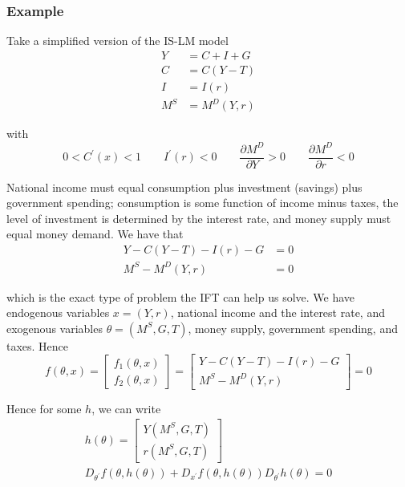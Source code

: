 \documentclass{article}
\begin{document}
\subsubsection{Example}
\label{ssub:example}

Take a simplified version of the IS-LM model
\begin{align*}
  Y   & = C + I + G   \\
  C   & = C(Y - T)    \\
  I   & = I(r)        \\
  M^S & = M^D(Y, r)
\end{align*}

with
\[
  0 < C^\prime(x) < 1
  \quad\quad
  I^\prime(r) < 0
  \quad\quad
  \dfrac{\partial M^D}{\partial Y} > 0
  \quad\quad
  \dfrac{\partial M^D}{\partial r} < 0
\]

National income must equal consumption plus investment (savings) plus government spending; consumption is some function of income minus taxes, the level of investment is determined by the interest rate, and money supply must equal money demand.  We have that
\begin{align*}
  Y - C(Y - T) - I(r) - G & = 0 \\
  M^S - M^D (Y, r)        & = 0
\end{align*}

which is the exact type of problem the IFT can help us solve. We have endogenous variables $x = (Y, r)$, national income and the interest rate, and exogenous variables $\theta = (M^S, G, T)$, money supply, government spending, and taxes. Hence
\begin{equation}
 \label{eq:is_lm_example}
  f(\theta, x)
  =
  \left[\begin{matrix}
    f_1(\theta, x) \\
    f_2(\theta, x)
  \end{matrix}\right]
  =
  \left[\begin{matrix}
    Y - C(Y - T) - I(r) - G \\
    M^S - M^D (Y, r)
  \end{matrix}\right]
  = 0
\end{equation}

Hence for some $h$, we can write
\begin{equation}
  \begin{array}{c}
    h(\theta)
    = \left[\begin{matrix}
      Y(M^S, G, T) \\
      r(M^S, G, T)
    \end{matrix}\right] \\[6pt]
    D_{\theta^\prime} f(\theta, h(\theta)) + D_{x^\prime} f(\theta, h(\theta)) D_{\theta^\prime} h(\theta) = 0
  \end{array}
  \nonumber
\end{equation}
\end{document}
